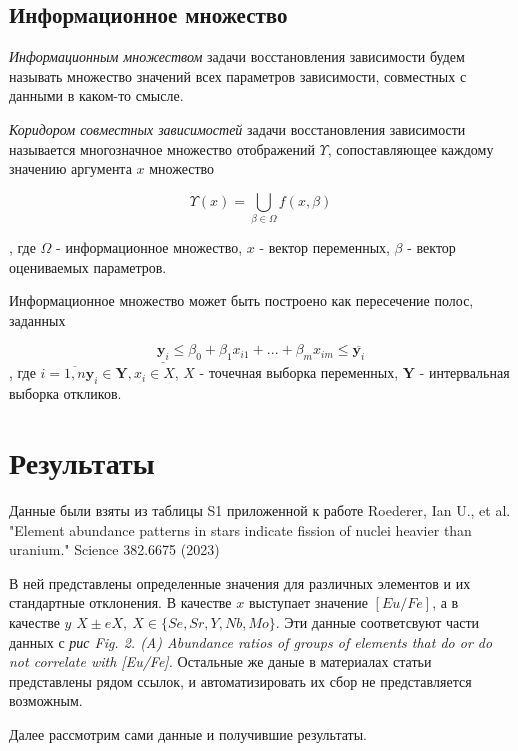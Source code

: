 \documentclass[a4paper,12pt]{article}
\begin{document}
    \subsection{Информационное множество}
    \quad \textsl{Информационным множеством} задачи восстановления зависимости
    будем называть множество значений всех параметров зависимости,
    совместных с данными в каком-то смысле. 

    \textsl{Коридором совместных зависимостей} задачи восстановления зависимости
    называется многозначное множество отображений $ \Upsilon $, сопоставляющее
    каждому значению аргумента $ x $ множество
    
    \begin{equation}
        \Upsilon(x) = \bigcup_{\beta \in \Omega} f(x, \beta)
    \end{equation}

    , где $ \Omega $ - информационное множество, $ x $ - вектор переменных, $ \beta $ - вектор оцениваемых параметров. 

    Информационное множество может быть построено как пересечение полос, заданных
    
    \begin{equation}
        \underline{\textbf{y}_i} \leq \beta_0 + \beta_1 x_{i1} + ... + \beta_m x_{im} \leq \overline{\textbf{y}_i}
    \end{equation}
    , где $ i = \overline{1, n} \textbf{y}_i \in \textbf{Y}, x_i \in X $, $ X $ - точечная выборка переменных,
    $ \textbf{Y} $ - интервальная выборка откликов.

    \section{Результаты}
    \quad Данные были взяты из таблицы S1 приложенной к работе Roederer, Ian U., et al. "Element abundance patterns in stars indicate fission of nuclei heavier than uranium." Science 382.6675 (2023)

    В ней представлены определенные значения для различных элементов и их стандартные отклонения.
    В качестве $x$ выступает значение $[Eu/Fe]$, а в качестве $y$ $X \pm eX,\ X \in \{Se, Sr, Y, Nb, Mo\}$.
    Эти данные соответсвуют части данных с \textit{рис Fig. 2. (A) Abundance ratios of groups of elements that do or do not correlate with [Eu/Fe]. }
    Остальные же даные в материалах статьи представлены рядом ссылок, и автоматизировать их сбор не представляется возможным.

    Далее рассмотрим сами данные и получившие результаты.
\end{document}
